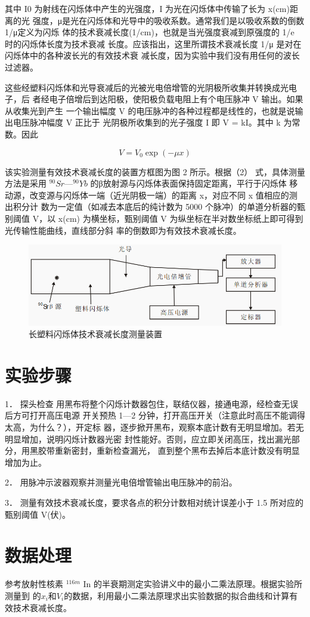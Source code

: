 \documentclass{article}
\begin{document}
其中 I0 为射线在闪烁体中产生的光强度，I 为光在闪烁体中传输了长为 x(cm)距离的光
强度，μ是光在闪烁体和光导中的吸收系数。通常我们是以吸收系数的倒数 1/μ定义为闪烁
体的技术衰减长度(1/cm)，也就是当光强度衰减到原强度的 1/e 时的闪烁体长度为技术衰减
长度。应该指出，这里所谓技术衰减长度 1/μ 是对在闪烁体中的各种波长光的有效技术衰
减长度，因为实验中我们没有用任何的波长过滤器。


这些经塑料闪烁体和光导衰减后的光被光电倍增管的光阴极所收集并转换成光电子，后
者经电子倍增后到达阳极，使阳极负载电阻上有个电压脉冲 V 输出。如果从收集光到产生
一个输出幅度 V 的电压脉冲的各种过程都是线性的，也就是说输出电压脉冲幅度 V 正比于
光阴极所收集到的光子强度 I 即 V = kI。其中 k 为常数。因此

\begin{equation}
	V=V_0\exp(-\mu x)
\end{equation}


该实验测量有效技术衰减长度的装置方框图为图 2 所示。根据（2）
式，具体测量方法是采用 $ ^{90}Sr—^{90}Yb $ 的β放射源与闪烁体表面保持固定距离，平行于闪烁体
移动源，改变源与闪烁体一端（近光阴极一端）的距离 x，对应不同 x 值相应的测出积分计
数为一定值（如减去本底后的纯计数为 5000 个脉冲）的单道分析器的甄别阈值 V，以 x(cm)
为横坐标，甄别阈值 V 为纵坐标在半对数坐标纸上即可得到光传输性能曲线，直线部分斜
率的倒数即为有效技术衰减长度。
	\begin{figure}[!h]
	
	\centering
	\includegraphics[scale=0.7]{原理2}
	\caption{\heiti{}长塑料闪烁体技术衰减长度测量装置}
	
\end{figure}

\section{实验步骤}
1． 探头检查
用黑布将整个闪烁计数器包住，联结仪器，接通电源，经检查无误后方可打开高压电源
开关预热 1—2 分钟，打开高压开关（注意此时高压不能调得太高，为什么？），开定标
器，逐步掀开黑布，观察本底计数有无明显增加。若无明显增加，说明闪烁计数器光密
封性能好。否则，应立即关闭高压，找出漏光部分，用黑胶带重新密封，重新检查漏光，
直到整个黑布去掉后本底计数没有明显增加为止。


2． 用脉冲示波器观察并测量光电倍增管输出电压脉冲的前沿。


3． 测量有效技术衰减长度，要求各点的积分计数相对统计误差小于 1.5%
所对应的甄别阈值 V(伏)。

\section{数据处理}
参考放射性核素 $ ^{116m }$
In 的半衰期测定实验讲义中的最小二乘法原理。根据实验所测量到
的$ x_i $和$ V_i $的数据，利用最小二乘法原理求出实验数据的拟合曲线和计算有效技术衰减长度。
\end{document}
